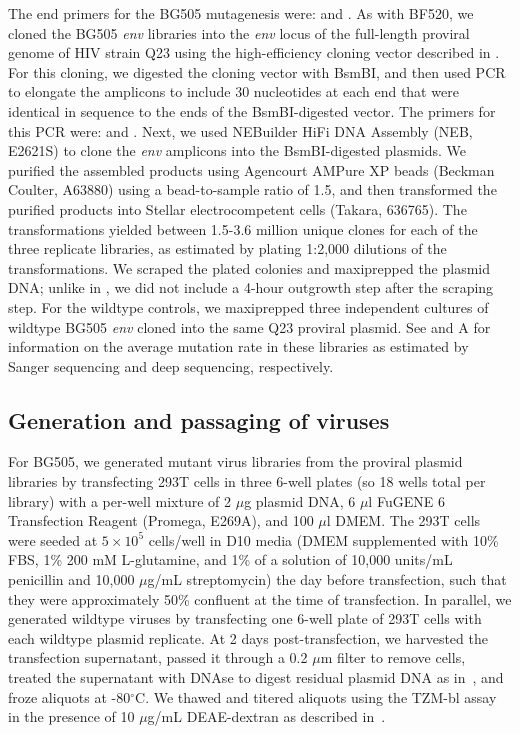 \documentclass[9pt]{elife}
\begin{document}
The end primers for the BG505 mutagenesis were:  and .
As with BF520, we cloned the BG505 \textit{env} libraries into the \textit{env} locus of the full-length proviral genome of HIV strain Q23 \citep[another subtype-A transmitted/founder virus;][]{poss1999variants} using the high-efficiency cloning vector described in \citet{dingens2017comprehensive}.
For this cloning, we digested the cloning vector with BsmBI, and then used PCR to elongate the amplicons to include 30 nucleotides at each end that were identical in sequence to the ends of the BsmBI-digested vector.
The primers for this PCR were:
 and .
Next, we used NEBuilder HiFi DNA Assembly (NEB, E2621S) to clone the \textit{env} amplicons into the BsmBI-digested plasmids.
We purified the assembled products using Agencourt AMPure XP beads (Beckman Coulter, A63880) using a bead-to-sample ratio of 1.5, and then transformed the purified products into Stellar electrocompetent cells (Takara, 636765).
The transformations yielded between 1.5-3.6 million unique clones for each of the three replicate libraries, as estimated by plating 1:2,000 dilutions of the transformations.
We scraped the plated colonies and maxiprepped the plasmid DNA; unlike in \citet{dingens2017comprehensive}, we did not include a 4-hour outgrowth step after the scraping step.
For the wildtype controls, we maxiprepped three independent cultures of wildtype BG505 \textit{env} cloned into the same Q23 proviral plasmid.
See  and A for information on the average mutation rate in these libraries as estimated by Sanger sequencing and deep sequencing, respectively.

\subsection{Generation and passaging of viruses}
For BG505, we generated mutant virus libraries from the proviral plasmid libraries by transfecting 293T cells in three 6-well plates (so 18 wells total per library) with a per-well mixture of 2 $\mu$g plasmid DNA, 6 $\mu$l FuGENE 6 Transfection Reagent (Promega, E269A), and 100 $\mu$l DMEM.
The 293T cells were seeded at $5\times 10^5$ cells/well in D10 media (DMEM supplemented with 10\% FBS, 1\% 200 mM L-glutamine, and 1\% of a solution of 10,000 units/mL penicillin and 10,000 $\mu$g/mL streptomycin) the day before transfection, such that they were approximately 50\% confluent at the time of transfection.
In parallel, we generated wildtype viruses by transfecting one 6-well plate of 293T cells with each wildtype plasmid replicate.
At 2 days post-transfection, we harvested the transfection supernatant, passed it through a 0.2 $\mu$m filter to remove cells, treated the supernatant with DNAse to digest residual plasmid DNA as in~\citet{haddox2016experimental}, and froze aliquots at -80$^{\circ}$C.
We thawed and titered aliquots using the TZM-bl assay in the presence of 10 $\mu$g/mL DEAE-dextran as described in~\citet{dingens2017comprehensive}.
\end{document}
